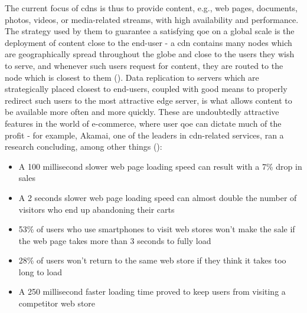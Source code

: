     The current focus of \glspl{cdn} is thus to provide content, e.g., web pages, documents, photos, videos, or media-related streams, with high availability and performance.
    The strategy used by them to guarantee a satisfying \gls{qoe} on a global scale is the deployment of content close to the end-user - a \gls{cdn} contains many nodes which are geographically spread throughout the globe and close to the users they wish to serve, and whenever such users request for content, they are routed to the node which is closest to them (\cite{cookbook}).
    Data replication to servers which are strategically placed closest to end-users, coupled with good means to properly redirect such users to the most attractive edge server, is what allows content to be available more often and more quickly.
    These are undoubtedly attractive features in the world of e-commerce, where user \gls{qoe} can dictate much of the profit - for example, Akamai, one of the leaders in \gls{cdn}-related services, ran a research concluding, among other things (\cite{akamai}):

\begin{itemize}
    \item A 100 millisecond slower web page loading speed can result with a 7\% drop in sales
    \item A 2 seconds slower web page loading speed can almost double the number of visitors who end up abandoning their carts
    \item 53\% of users who use smartphones to visit web stores won't make the sale if the web page takes more than 3 seconds to fully load
    \item 28\% of users won't return to the same web store if they think it takes too long to load
    \item A 250 millisecond faster loading time proved to keep users from visiting a competitor web store
\end{itemize}{}

